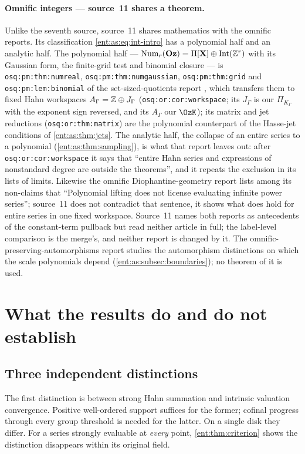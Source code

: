 \documentclass[11pt]{article}
\theoremstyle{plain}
\theoremstyle{plain}
\theoremstyle{plain}
\theoremstyle{definition}
\theoremstyle{definition}
\theoremstyle{definition}
\theoremstyle{definition}
\theoremstyle{remark}
\newcommand{\K}{K_\Gamma}\newcommand{\KD}{K_\Delta}
\newcommand{\Oz}{\mathbf{Oz}}\newcommand{\Ed}{\mathcal E_{\Gamma,d}}
\newcommand{\PiK}{\Pi_{\K}}\newcommand{\pg}{\mathsf p}
\DeclareMathOperator{\Int}{Int}\DeclareMathOperator{\ct}{ct}
\begin{document}
\paragraph{Omnific integers --- source~11 shares a theorem.}
Unlike the seventh source, source~11 shares mathematics with the omnific
reports. Its classification \eqref{ent:as:eq:int-intro} has a polynomial half
and an analytic half. The polynomial half ---
$\operatorname{Num}_r(\Oz)=\Pi[\mathbf X]\oplus\Int(\Z^r)$ with its Gaussian form,
the finite-grid test and binomial closure --- is \texttt{osq:pm:thm:numreal},
\texttt{osq:pm:thm:numgaussian}, \texttt{osq:pm:thm:grid} and
\texttt{osq:pm:lem:binomial} of the set-sized-quotients report
\cite{RepoQuotients}, which transfers them to fixed Hahn workspaces
$A_\Gamma=\mathbb Z\oplus J_\Gamma$ (\texttt{osq:or:cor:workspace}; its $J_\Gamma$ is
our $\PiK$ with the exponent sign reversed, and its $A_\Gamma$ our $\OzK$); its
matrix and jet reductions (\texttt{osq:or:thm:matrix}) are the polynomial
counterpart of the Hasse-jet conditions of \cref{ent:as:thm:jets}. The
analytic half, the collapse of an entire series to a polynomial
(\cref{ent:as:thm:sampling}), is what that report leaves out: after
\texttt{osq:or:cor:workspace} it says that ``entire Hahn series and expressions
of nonstandard degree are outside the theorems'', and it repeats the exclusion
in its lists of limits. Likewise the omnific Diophantine-geometry report
\cite{RepoODG} lists among its non-claims that ``Polynomial lifting does not
license evaluating infinite power series''; source~11 does not contradict that
sentence, it shows what does hold for entire series in one fixed workspace.
Source~11 names both reports as antecedents of the constant-term pullback but
read neither article in full; the label-level comparison is the merge's, and
neither report is changed by it. The omnific-preserving-automorphisms report
\cite{RepoOPA} studies the automorphism distinctions on which the scale
polynomials depend (\cref{ent:as:subsec:boundaries}); no theorem of it is
used.

\section{What the results do and do not establish}
\label{ent:sec:scope}

\subsection{Three independent distinctions}
\label{ent:subsec:three-distinctions}
The first distinction is between strong Hahn summation and intrinsic
valuation convergence. Positive well-ordered support suffices for the former;
cofinal progress through every group threshold is needed for the latter. On a
single disk they differ. For a series strongly evaluable at \emph{every}
point, \cref{ent:thm:criterion} shows the distinction disappears within its
original field.
\end{document}
